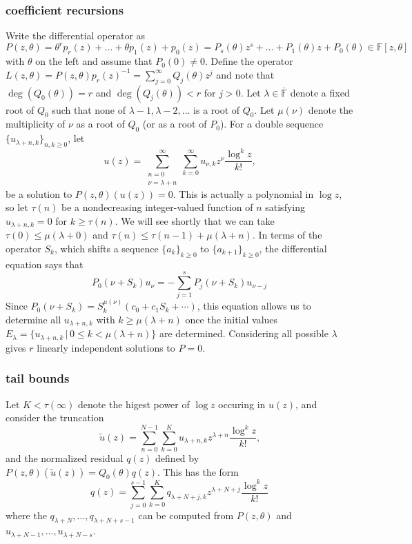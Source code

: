 \documentclass[10pt]{article}
\begin{document}
\subsubsection{coefficient recursions}
Write the differential operator as $P(z,\theta) = \theta^r p_r(z) + \dots + \theta p_1(z) + p_0(z) = P_s(\theta) z^s + \dots + P_1(\theta) z + P_0(\theta) \in\mathbb{F}[z,\theta]$ with $\theta$ on the left and assume that $P_0(0) \neq 0$. Define the operator $L(z,\theta) = P(z,\theta) p_r(z)^{-1} = \sum_{j=0}^{\infty} Q_j(\theta) z^j$ and note that $\deg(Q_0(\theta)) = r$ and $\deg(Q_j(\theta)) < r$ for $j > 0$. Let $\lambda \in \overline{\mathbb{F}}$ denote a fixed root of $Q_0$ such that none of $\lambda-1, \lambda-2, \dots$ is a root of $Q_0$. Let $\mu(\nu)$ denote the multiplicity of $\nu$ as a root of $Q_0$ (or as a root of $P_0$). For a double sequence $\{u_{\lambda + n, k}\}_{n,k \ge 0}$, let
\begin{equation*}
u(z) = \sum_{\substack{n=0 \\ \nu=\lambda+n}}^{\infty} \sum_{k=0}^{\infty} u_{\nu,k} z^{\nu} \frac{\log^k z}{k!}\text{,}
\end{equation*}
be a solution to $P(z,\theta)(u(z)) = 0$. This is actually a polynomial in $\log z$, so let $\tau(n)$ be a nondecreasing integer-valued function of $n$ satisfying 
$u_{\lambda+n, k} = 0$ for $k \ge \tau(n)$. We will see shortly that we can take $\tau(0) \le \mu(\lambda + 0)$ and $\tau(n) \le \tau(n-1)+\mu(\lambda+n)$. In terms of the operator $S_k$, which shifts a sequence $\{a_k\}_{k \ge 0}$ to $\{a_{k+1}\}_{k \ge 0}$, the differential equation says that
\begin{equation*}
P_0(\nu + S_k) u_{\nu} = - \sum_{j=1}^{s} P_j(\nu + S_k) u_{\nu - j}
\end{equation*}
Since $P_0(\nu + S_k) = S_k^{\mu(\nu)}( c_0 + c_1 S_k + \cdots )$, this equation allows us to determine all $u_{\lambda+n, k}$ with $k \ge \mu(\lambda+n)$ once the initial values $E_{\lambda} = \{u_{\lambda+n, k} \, | \, 0 \le k < \mu(\lambda+n)\}$ are determined. Considering all possible $\lambda$ gives $r$ linearly independent solutions to $P=0$.

\subsubsection{tail bounds}
Let $K < \tau(\infty)$ denote the higest power of $\log z$ occuring in $u(z)$, and consider the truncation
\begin{equation*}
\tilde{u}(z) = \sum_{n=0}^{N-1} \sum_{k=0}^{K} u_{\lambda + n,k} z^{\lambda + n} \frac{\log^k z}{k!}\text{,}
\end{equation*}
and the normalized residual $q(z)$ defined by $P(z,\theta)(\tilde{u}(z)) = Q_0(\theta) q(z)$. This has the form
\begin{equation*}
q(z) = \sum_{j=0}^{s-1} \sum_{k = 0}^{K} q_{\lambda + N + j, k} z^{\lambda + N + j} \frac{\log^k z}{k!}
\end{equation*}
where the $q_{\lambda+N}, \dots, q_{\lambda+N+s-1}$ can be computed from $P(z,\theta)$ and $u_{\lambda+N-1}, \dots, u_{\lambda+N-s}$.
\end{document}

